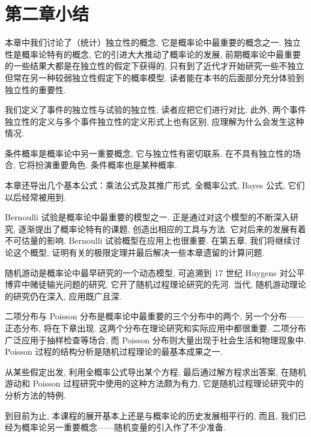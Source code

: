 \documentclass[../../main.tex]{subfiles}
\begin{document}
\section*{第二章小结}\label{section:ch02-第二章小结}


本章中我们讨论了（统计）独立性的概念, 它是概率论中最重要的概念之一. 独立性是概率论特有的概念, 它的引进大大推动了概率论的发展, 前期概率论中最重要的一些结果大都是在独立性的假定下获得的, 只有到了近代才开始研究一些不独立但常在另一种较弱独立性假定下的概率模型. 读者能在本书的后面部分充分体验到独立性的重要性.

我们定义了事件的独立性与试验的独立性, 读者应把它们进行对比. 此外, 两个事件独立性的定义与多个事件独立性的定义形式上也有区别, 应理解为什么会发生这种情况.

条件概率是概率论中另一重要概念, 它与独立性有密切联系. 在不具有独立性的场合, 它将扮演重要角色. 条件概率也是某种概率.

本章还导出几个基本公式：乘法公式及其推广形式, 全概率公式, Bayes 公式, 它们以后经常被用到.

Bernoulli 试验是概率论中最重要的模型之一. 正是通过对这个模型的不断深入研究, 逐渐提出了概率论特有的课题, 创造出相应的工具与方法. 它对后来的发展有着不可估量的影响. Bernoulli 试验概型在应用上也很重要. 在第五章, 我们将继续讨论这个概型, 证明有关的极限定理并最后解决一些本章遗留的计算问题.

随机游动是概率论中最早研究的一个动态模型, 可追溯到 17 世纪 Huygens 对公平博弈中赌徒输光问题的研究, 它开了随机过程理论研究的先河. 当代, 随机游动理论的研究仍在深入, 应用既广且深.

二项分布与 Poisson 分布是概率论中最重要的三个分布中的两个, 另一个分布——正态分布, 将在下章出现. 这两个分布在理论研究和实际应用中都很重要. 二项分布广泛应用于抽样检查等场合, 而 Poisson 分布则大量出现于社会生活和物理现象中. Poisson 过程的结构分析是随机过程理论的最基本成果之一.

从某些假定出发, 利用全概率公式导出某个方程, 最后通过解方程求出答案, 在随机游动和 Poisson 过程研究中使用的这种方法颇为有力, 它是随机过程理论研究中的分析方法的特例.

到目前为止, 本课程的展开基本上还是与概率论的历史发展相平行的, 而且, 我们已经为概率论另一重要概念——随机变量的引入作了不少准备.
\end{document}
